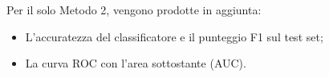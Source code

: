 \begin{onehalfspace}
Per il solo Metodo 2, vengono prodotte in aggiunta:
\begin{itemize}
    \item L'accuratezza del classificatore e il punteggio F1 sul test set;
    \item La curva ROC con l'area sottostante (\ac{AUC}).
\end{itemize}

\end{onehalfspace}
